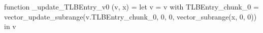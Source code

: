 function _update_TLBEntry_v0 (v, x) = let v = { v with TLBEntry_chunk_0 = vector_update_subrange(v.TLBEntry_chunk_0, 0, 0, vector_subrange(x, 0, 0)) } in v
